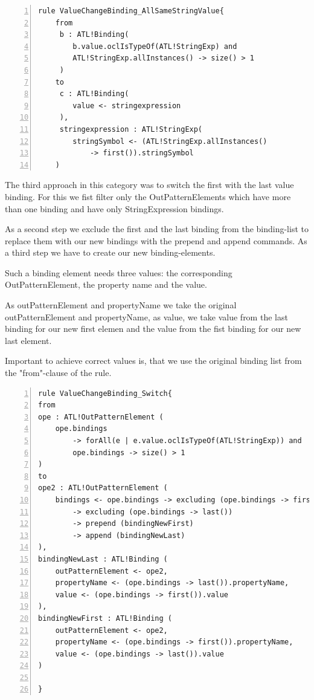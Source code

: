 \documentclass{llncs}
\begin{document}
\begin{lstlisting}[language=ATL, numbers=left,xleftmargin=5.0ex, caption=ValueChangeBinding-Definition using same constant string value., label=lst:vcbconstant]
rule ValueChangeBinding_AllSameStringValue{
	from
	 b : ATL!Binding(
	 	b.value.oclIsTypeOf(ATL!StringExp) and 
		ATL!StringExp.allInstances() -> size() > 1
	 )
	to
	 c : ATL!Binding(
	 	value <- stringexpression
	 ), 
	 stringexpression : ATL!StringExp(
	 	stringSymbol <- (ATL!StringExp.allInstances() 
			-> first()).stringSymbol
	)
\end{lstlisting}

The third approach in this category was to switch the first with the last value binding. For this we fist filter only the OutPatternElements which have more than one binding and have only StringExpression bindings.

As a second step we exclude the first and the last binding from the binding-list to replace them with our new bindings with the prepend and append commands. As a third step we have to create our new binding-elements.

Such a binding element needs three values: the corresponding OutPatternElement, the property name and the value.

As outPatternElement and propertyName we take the original outPatternElement and propertyName, as value, we take value from the last binding for our new first elemen and the value from the fist binding for our new last element.

Important to achieve correct values is, that we use the original binding list from the "from"-clause of the rule.

\begin{lstlisting}[language=ATL, numbers=left,xleftmargin=5.0ex, caption=ValueChangeBinding-Definition using values from input models., label=lst:2ndOrderHOT]
rule ValueChangeBinding_Switch{
from
ope : ATL!OutPatternElement (
	ope.bindings 
		-> forAll(e | e.value.oclIsTypeOf(ATL!StringExp)) and
		ope.bindings -> size() > 1
)
to
ope2 : ATL!OutPatternElement (
	bindings <- ope.bindings -> excluding (ope.bindings -> first()) 
		-> excluding (ope.bindings -> last())
		-> prepend (bindingNewFirst)
		-> append (bindingNewLast)
), 
bindingNewLast : ATL!Binding (
	outPatternElement <- ope2, 
	propertyName <- (ope.bindings -> last()).propertyName,
	value <- (ope.bindings -> first()).value
),
bindingNewFirst : ATL!Binding (
	outPatternElement <- ope2,
	propertyName <- (ope.bindings -> first()).propertyName,
	value <- (ope.bindings -> last()).value	
)
	
}
\end{lstlisting}
\end{document}
